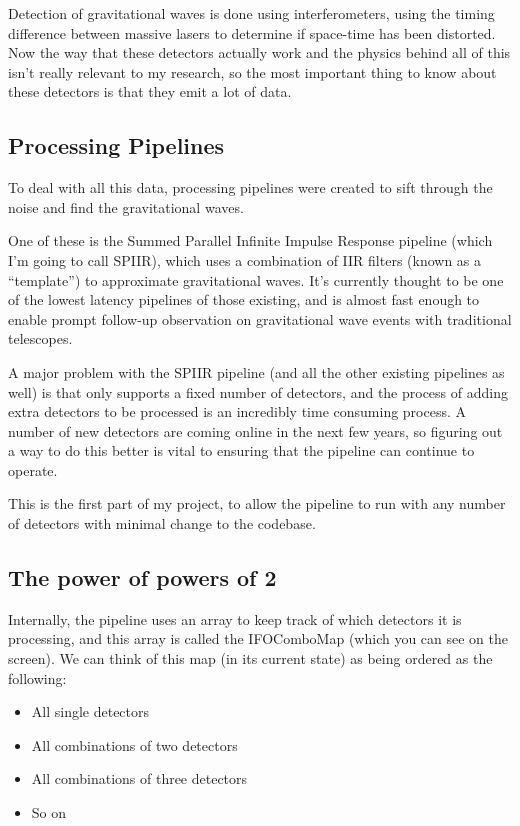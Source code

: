 \documentclass{article}
\begin{document}
Detection of gravitational waves is done using interferometers, using the timing difference between massive lasers to determine if space-time has been distorted.
Now the way that these detectors actually work and the physics behind all of this isn't really relevant to my research, so the most important thing to know about these detectors is that they emit a lot of data.

\subsection{Processing Pipelines}

To deal with all this data, processing pipelines were created to sift through the noise and find the gravitational waves.

One of these is the Summed Parallel Infinite Impulse Response pipeline (which I'm going to call SPIIR), which uses a combination of IIR filters (known as a ``template'') to approximate gravitational waves.
It's currently thought to be one of the lowest latency pipelines of those existing, and is almost fast enough to enable prompt follow-up observation on gravitational wave events with traditional telescopes.

A major problem with the SPIIR pipeline (and all the other existing pipelines as well) is that only supports a fixed number of detectors, and the process of adding extra detectors to be processed is an incredibly time consuming process.
A number of new detectors are coming online in the next few years, so figuring out a way to do this better is vital to ensuring that the pipeline can continue to operate.

This is the first part of my project, to allow the pipeline to run with any number of detectors with minimal change to the codebase.

\subsection{The power of powers of 2}

Internally, the pipeline uses an array to keep track of which detectors it is processing, and this array is called the IFOComboMap (which you can see on the screen).
We can think of this map (in its current state) as being ordered as the following:

\begin{itemize}
    \item All single detectors
    \item All combinations of two detectors
    \item All combinations of three detectors
    \item So on
\end{itemize}
\end{document}
